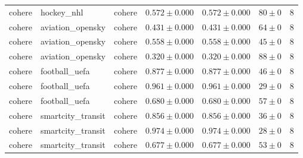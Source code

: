 \begin{table}[htbp]
\begin{tabular}{l l l r r r r}
cohere & hockey\_nhl & cohere & $0.572\pm0.000$ & $0.572\pm0.000$ & $80\pm0$ & 8 \\
cohere & aviation\_opensky & cohere & $0.431\pm0.000$ & $0.431\pm0.000$ & $64\pm0$ & 8 \\
cohere & aviation\_opensky & cohere & $0.558\pm0.000$ & $0.558\pm0.000$ & $45\pm0$ & 8 \\
cohere & aviation\_opensky & cohere & $0.320\pm0.000$ & $0.320\pm0.000$ & $88\pm0$ & 8 \\
cohere & football\_uefa & cohere & $0.877\pm0.000$ & $0.877\pm0.000$ & $46\pm0$ & 8 \\
cohere & football\_uefa & cohere & $0.961\pm0.000$ & $0.961\pm0.000$ & $29\pm0$ & 8 \\
cohere & football\_uefa & cohere & $0.680\pm0.000$ & $0.680\pm0.000$ & $57\pm0$ & 8 \\
cohere & smartcity\_transit & cohere & $0.856\pm0.000$ & $0.856\pm0.000$ & $36\pm0$ & 8 \\
cohere & smartcity\_transit & cohere & $0.974\pm0.000$ & $0.974\pm0.000$ & $28\pm0$ & 8 \\
cohere & smartcity\_transit & cohere & $0.677\pm0.000$ & $0.677\pm0.000$ & $53\pm0$ & 8 \\
\hline
\end{tabular}
\end{table}
